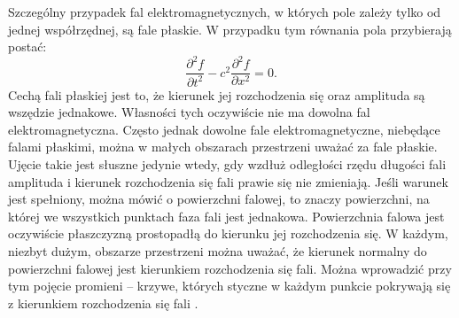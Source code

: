 \quad \quad 
Szczególny przypadek fal elektromagnetycznych, w których pole zależy tylko od jednej współrzędnej, są fale płaskie. W przypadku tym równania pola przybierają postać:
%
$$\frac{\partial^2 f}{\partial t^2}-c^2 \frac{\partial^2 f}{\partial x^2}=0.$$
%
Cechą fali płaskiej jest to, że kierunek jej rozchodzenia się oraz amplituda są wszędzie jednakowe. Własności tych oczywiście nie ma dowolna fal elektromagnetyczna. Często jednak dowolne fale elektromagnetyczne, niebędące falami płaskimi, można w małych obszarach przestrzeni uważać za fale płaskie. Ujęcie takie jest słuszne jedynie wtedy, gdy wzdłuż odległości rzędu długości fali amplituda i kierunek rozchodzenia się fali prawie się nie zmieniają. Jeśli warunek jest spełniony, można mówić o powierzchni falowej, to znaczy powierzchni, na której we wszystkich punktach faza fali jest jednakowa. Powierzchnia falowa jest oczywiście płaszczyzną prostopadłą do kierunku jej rozchodzenia się. W każdym, niezbyt dużym, obszarze przestrzeni można uważać, że kierunek normalny do powierzchni falowej jest kierunkiem rozchodzenia się fali. Można wprowadzić przy tym pojęcie promieni – krzywe, których styczne w każdym punkcie pokrywają się z kierunkiem rozchodzenia się fali \cite{TeoriaPolaLifszyc}.